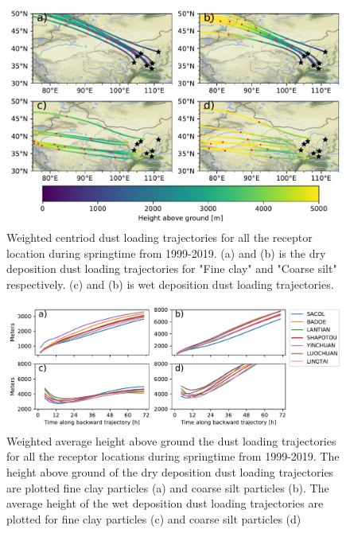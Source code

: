 \begin{figure}[hptb]
    \centering
    \includegraphics[width=\textwidth]{texfiles/figs/centriod_dust_loading_trajectories.pdf}
    \caption{Weighted centriod dust loading trajectories for all the receptor location during springtime from 1999-2019. (a) and (b) is the dry deposition dust loading trajectories for "Fine clay" and "Coarse silt" respectively.  (c) and (b) is wet deposition dust loading trajectories. }
    \label{fig:dust_loading_trajecs}
\end{figure}

\begin{figure}[hptb]
    \centering
    \includegraphics[width=\textwidth]{texfiles/figs/average_dust_transport_height.pdf}
    \caption{Weighted average height above ground the dust loading trajectories for all the receptor locations during 
    springtime from 1999-2019. The height above ground of the dry deposition dust loading trajectories are plotted fine clay particles (a) and coarse silt particles (b). The average height of the wet deposition dust loading trajectories are plotted for fine clay particles (c) and coarse silt particles (d)}
    \label{fig:dust_loading_trajecs_height}
\end{figure}






